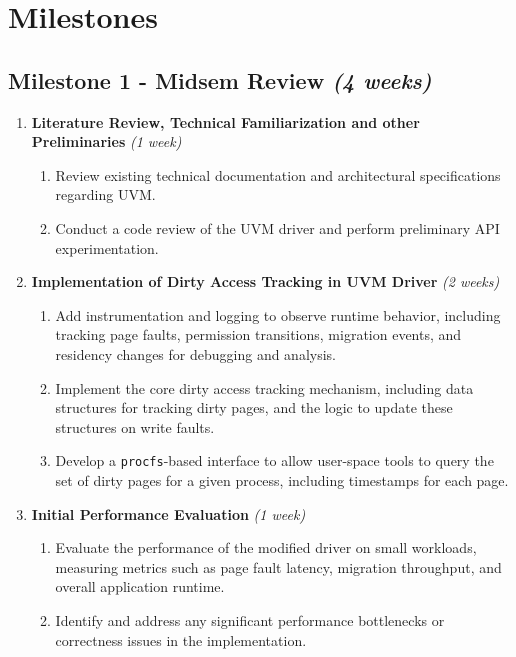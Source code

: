 \section*{Milestones}

\subsection*{Milestone 1 - Midsem Review \hfill \textit{(4 weeks)}} 

    \begin{enumerate}
        \item \textbf{Literature Review, Technical Familiarization and other Preliminaries} \hfill \textit{(1 week)}
        \begin{enumerate}
            \item Review existing technical documentation and architectural specifications regarding UVM.
            \item Conduct a code review of the UVM driver and perform preliminary API experimentation.
        \end{enumerate}
    
        \item \textbf{Implementation of Dirty Access Tracking in UVM Driver}  \hfill \textit{(2 weeks)}
        \begin{enumerate}
            \item Add instrumentation and logging to observe runtime behavior, including tracking page faults, permission transitions, migration events, and residency changes for debugging and analysis.
            \item Implement the core dirty access tracking mechanism, including data structures for tracking dirty pages, and the logic to update these structures on write faults.
            \item Develop a \texttt{procfs}-based interface to allow user-space tools to query the set of dirty pages for a given process, including timestamps for each page.
        \end{enumerate}
        
        \item \textbf{Initial Performance Evaluation} \hfill \textit{(1 week)}
        \begin{enumerate}
            \item Evaluate the performance of the modified driver on small workloads, measuring metrics such as page fault latency, migration throughput, and overall application runtime.
            \item Identify and address any significant performance bottlenecks or correctness issues in the implementation.
        \end{enumerate}
    \end{enumerate}

